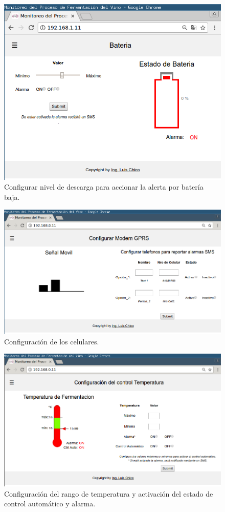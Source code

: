 \begin{figure}[h]
  \centering
  \includegraphics[scale=.35]{./Figures/config_bat.png}
  \caption{Configurar nivel de descarga para accionar la alerta por batería baja.}
  \label{fig:web_bat}
\end{figure}
\begin{figure}[h]
  \centering
  \includegraphics[scale=.35]{./Figures/config_Modem.png}
  \caption{Configuración de los celulares.}
  \label{fig:web_Modem}
\end{figure}
\begin{figure}[h]
  \centering
  \includegraphics[scale=.35]{./Figures/config_temp.png}
  \caption{Configuración del rango de temperatura y activación del estado de control automático y alarma.}
  \label{fig:web_temp}
\end{figure}
